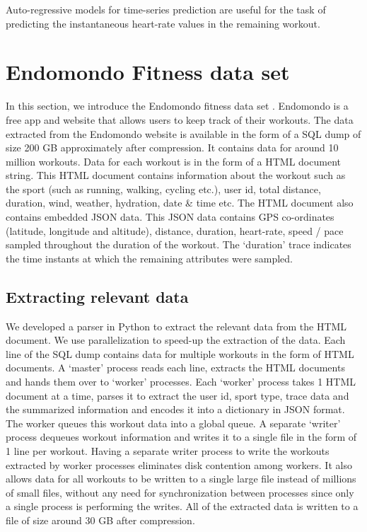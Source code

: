\documentclass{acm_proc_article-sp}
\begin{document}
Auto-regressive models \cite{autoRegressiveModelWiki} for time-series prediction are useful for the task of predicting the instantaneous heart-rate values in the remaining workout.

\section{Endomondo Fitness data set}
\label{expAnalysis}
In this section, we introduce the Endomondo fitness data set \cite{endomondo}. Endomondo \cite{endomondo} is a free app and website that allows users to keep track of their workouts. The data extracted from the Endomondo website \cite{endomondo} is available in the form of a SQL dump of size 200 GB approximately after compression. It contains data for around 10 million workouts. Data for each workout is in the form of a HTML document string. This HTML document contains information about the workout such as the sport (such as running, walking, cycling etc.), user id, total distance, duration, wind, weather, hydration, date \& time etc. The HTML document also contains embedded JSON data. This JSON data contains GPS co-ordinates (latitude, longitude and altitude), distance, duration, heart-rate, speed / pace sampled throughout the duration of the workout. The `duration' trace indicates the time instants at which the remaining attributes were sampled.

\subsection{Extracting relevant data}
We developed a parser in Python to extract the relevant data from the HTML document. We use parallelization to speed-up the extraction of the data. Each line of the SQL dump contains data for multiple workouts in the form of HTML documents. A `master' process reads each line, extracts the HTML documents and hands them over to `worker' processes. Each `worker' process takes 1 HTML document at a time, parses it to extract the user id, sport type, trace data and the summarized information and encodes it into a dictionary in JSON format. The worker queues this workout data into a global queue. A separate `writer' process dequeues workout information and writes it to a single file in the form of 1 line per workout. Having a separate writer process to write the workouts extracted by worker processes eliminates disk contention among workers. It also allows data for all workouts to be written to a single large file instead of millions of small files, without any need for synchronization between processes since only a single process is performing the writes. All of the extracted data is written to a file of size around 30 GB after compression.
\end{document}
